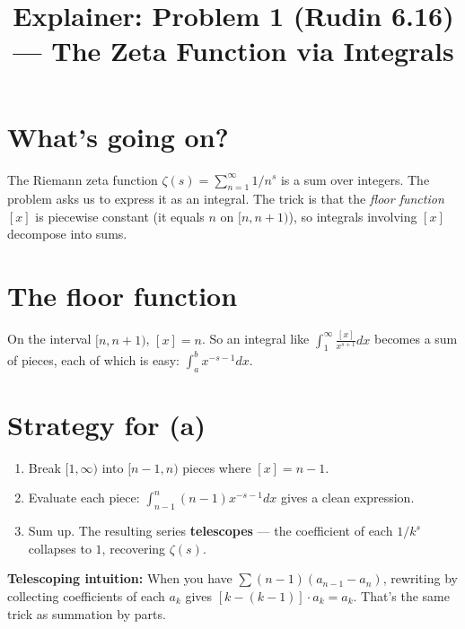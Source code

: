 \documentclass[12pt]{article}
\title{Explainer: Problem 1 (Rudin 6.16) --- The Zeta Function via Integrals}
\author{}
\date{}
\begin{document}
\maketitle

\section*{What's going on?}
The Riemann zeta function $\zeta(s) = \sum_{n=1}^{\infty} 1/n^s$ is a sum over integers. The problem asks us to express it as an integral. The trick is that the \emph{floor function} $[x]$ is piecewise constant (it equals $n$ on $[n, n+1)$), so integrals involving $[x]$ decompose into sums.

\section*{The floor function}
\begin{center}
\end{center}
On the interval $[n, n+1)$, $[x] = n$. So an integral like $\int_1^\infty \frac{[x]}{x^{s+1}} dx$ becomes a sum of pieces, each of which is easy: $\int_a^b x^{-s-1} dx$.

\section*{Strategy for (a)}
\begin{enumerate}
  \item Break $[1, \infty)$ into $[n-1, n)$ pieces where $[x] = n-1$.
  \item Evaluate each piece: $\int_{n-1}^{n} (n-1) x^{-s-1} dx$ gives a clean expression.
  \item Sum up. The resulting series \textbf{telescopes} --- the coefficient of each $1/k^s$ collapses to $1$, recovering $\zeta(s)$.
\end{enumerate}

\textbf{Telescoping intuition:} When you have $\sum (n-1)(a_{n-1} - a_n)$, rewriting by collecting coefficients of each $a_k$ gives $[k - (k-1)] \cdot a_k = a_k$. That's the same trick as summation by parts.
\end{document}
